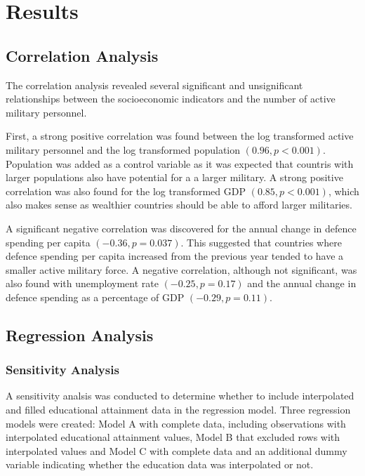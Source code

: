 \chapter{Results}

\section{Correlation Analysis}

The correlation analysis revealed several significant and unsignificant relationships 
between the socioeconomic indicators and the number of active military personnel.

First, a strong positive correlation was found between the log transformed 
active military personnel and the log transformed population $(0.96, p < 0.001)$.
Population was added as a control variable as it was expected that countris with 
larger populations also have potential for a a larger military. 
A strong positive correlation was 
also found for the log transformed GDP $(0.85, p < 0.001)$, which also makes sense 
as wealthier countries should be able to afford larger militaries.

A significant negative correlation was discovered for the annual change in defence 
spending per capita $(-0.36, p = 0.037)$. This suggested that countries where defence spending 
per capita increased from the previous year tended to have a smaller active military force.
A negative correlation, although not significant, was also found with unemployment rate 
$(-0.25, p = 0.17)$ and the annual change in defence spending as a percentage of GDP 
$(-0.29, p = 0.11)$.


\section{Regression Analysis}

\subsection{Sensitivity Analysis}

A sensitivity analsis was conducted to determine whether to include interpolated and filled educational 
attainment data in the regression model. Three regression models were created: Model A with 
complete data, including observations with interpolated educational attainment values, Model B 
that excluded rows with interpolated values and Model C with complete data and an additional 
dummy variable indicating whether the education data was interpolated or not.

